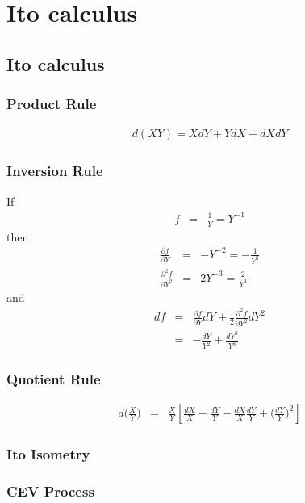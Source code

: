 \chapter{Ito calculus}

\section{Ito calculus}

\subsection{Product Rule}

\begin{eqnarray}
d(XY) = XdY + YdX +dX dY
\end{eqnarray}

\subsection{Inversion Rule}
If
\begin{eqnarray}
	f &=& \frac{1}{Y} = Y^{-1}
\end{eqnarray}
then
\begin{eqnarray}
	\frac{\partial f}{\partial Y} &=& -Y^{-2} = -\frac{1}{Y^{2}}\\
	\frac{\partial ^{2}f}{\partial Y^{2}} &=& 2Y^{-3} = \frac{2}{Y^{3}}
\end{eqnarray}
and
\begin{eqnarray}
	\nonumber
	df &=& \frac{\partial f}{\partial Y}dY + \frac{1}{2}\frac{\partial^{2}f}{\partial Y^{2}}dY^{2}\\
	&=& -\frac{dY}{Y^{2}} + \frac{dY^{2}}{Y^{3}}
\end{eqnarray}

\subsection{Quotient Rule}
\begin{eqnarray}
d\bigg(\frac{X}{Y}\bigg) &=& \frac{X}{Y}\left[\frac{dX}{X} - \frac{dY}{Y} - \frac{dX}{X}\frac{dY}{Y} + \Bigg(\frac{dY}{Y}\Bigg)^{2}\right]
\end{eqnarray}

\subsection{Ito Isometry}

\subsection{CEV Process}